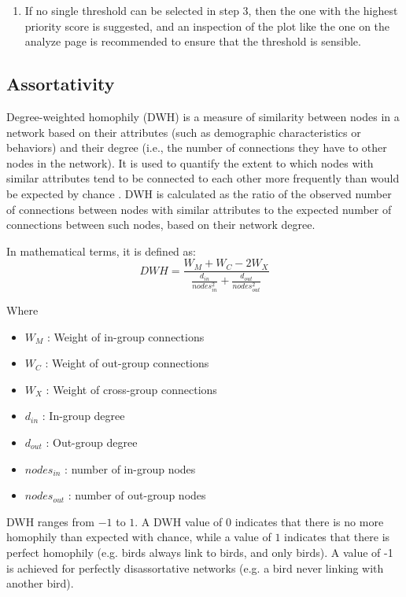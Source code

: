 \documentclass[utf8]{FrontiersinHarvard} %
\newcommand{\TODO}[1]{{\color{red}{#1}}}
\begin{document}
\begin{enumerate}
 \item{If no single threshold can be selected in step 3, then the one with the highest priority score is suggested, and an inspection of the plot like the one on the analyze page is recommended to ensure that the threshold is sensible.\TODO{HV: What's the analyze page? Define it here, or mention that it's defined below.}}
\end{enumerate}

\subsection{Assortativity}

Degree-weighted homophily (DWH) is a measure of similarity between nodes in a network based on their attributes (such as demographic characteristics or behaviors) and their degree (i.e., the number of connections they have to other nodes in the network). It is used to quantify the extent to which nodes with similar attributes tend to be connected to each other more frequently than would be expected by chance \TODO{add citation}. \TODO{HV: I like this explanation. Simple, clear, easy to see the biological/public health relevance.}
DWH is calculated as the ratio of the observed number of connections between nodes with similar attributes to the expected number of connections between such nodes, based on their network degree.

In mathematical terms, it is defined as:
\begin{equation}
  DWH = \frac{W_M + W_C - 2W_X}{\frac{d_{in}}{nodes_{in}^2} + \frac{d_{out}}{nodes_{out}^2}}
\end{equation}

Where
\begin{itemize}
  \item{$W_M$ : Weight of in-group connections}
  \item{$W_C$ : Weight of out-group connections}
  \item{$W_X$ : Weight of cross-group connections}
  \item{$d_{in}$ : In-group degree}
  \item{$d_{out}$ : Out-group degree}
  \item{$nodes_{in}$ : number of in-group nodes}
  \item{$nodes_{out}$ : number of out-group nodes}
\end{itemize}

DWH ranges from $-1$ to $1$. A DWH value of $0$ indicates that there is no more homophily than expected with chance, while a value of $1$
indicates that there is perfect homophily (e.g. birds always link to birds, and only birds). A value of -1 is achieved for perfectly disassortative networks (e.g. a bird never linking with another bird).
\end{document}
